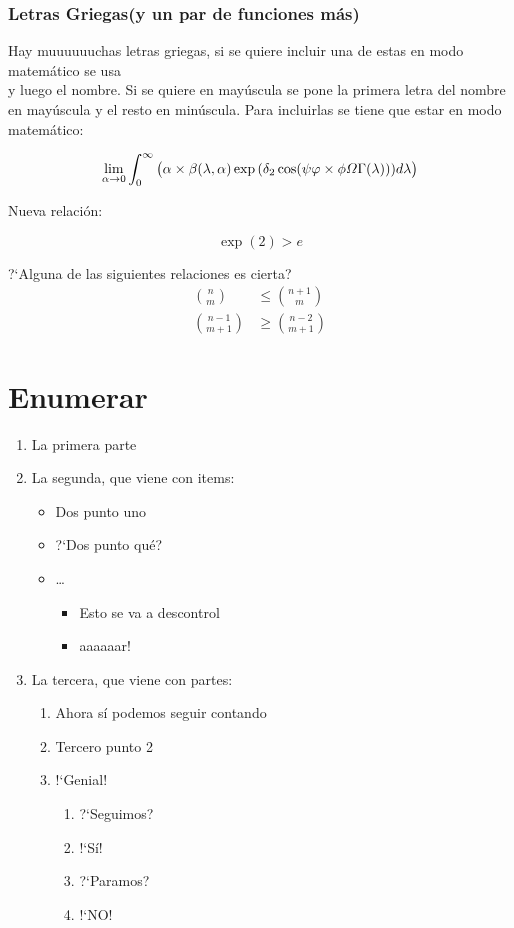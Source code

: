 \documentclass{article}
\begin{document}
\subsubsection{Letras Griegas(y un par de funciones m\'as)}
Hay muuuuuuchas letras griegas, si se quiere incluir una de estas en modo matem\'atico se usa \\ y luego el nombre. Si se quiere en may\'uscula se pone la primera letra del nombre en may\'uscula y el resto en min\'uscula. Para incluirlas se tiene que estar en modo matem\'atico:

$$\lim_{\alpha \to 0}\int_{0}^{\infty} \big(\alpha\times \beta(\lambda,\alpha) \exp{(\delta_{2}\cos(\psi\varphi\times \phi\varOmega\Gamma(\lambda)))} d\lambda\big)$$

Nueva relaci\'on:

\[\exp{(2)} > e \]

?`Alguna de las siguientes relaciones es cierta?
\begin{align*}
\binom{n}{m} &\leq \binom{n+1}{m}\\
\binom{n-1}{m+1} & \geq \binom{n-2}{m+1}
\end{align*}

\section{Enumerar}

\begin{enumerate}
	\item La primera parte
	\item La segunda, que viene con items:
	\begin{itemize}
		\item Dos punto uno
		\item ?`Dos punto qu\'e?
		\item \dots
		\begin{itemize}
			\item Esto se va a descontrol
			\item aaaaaar!
		\end{itemize}
	\end{itemize}
	\item La tercera, que viene con partes:
	\begin{enumerate}
		\item Ahora s\'i podemos seguir contando
		\item Tercero punto 2
		\item !`Genial!
		\begin{enumerate}
			\item ?`Seguimos?
			\item !`S\'i!
			\item ?`Paramos?
			\item !`NO!
		\end{enumerate}
	\end{enumerate}
\end{enumerate}
\end{document}
